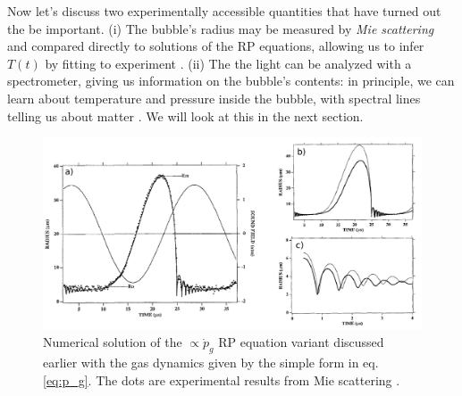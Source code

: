 \documentclass[11pt,prb,aps,nofootinbib,superscriptaddress,floatfix]{revtex4-2}
\begin{document}
Now let's discuss two experimentally accessible quantities that have turned out the be important. (i) The bubble's radius may be measured by \emph{Mie scattering} and compared directly to solutions of the RP equations, allowing us to infer $T(t)$ by fitting to experiment \cite{barber1992light,barber1997defining,brenner2002single}. (ii) The the light can be analyzed with a spectrometer, giving us information on the bubble's contents: in principle, we can learn about temperature and pressure inside the bubble, with spectral lines telling us about matter \cite{hiller1992spectrum,hilgenfeldt1999simple,flannigan2005plasma,flannigan2006measurement}. We will look at this in the next section.

\begin{figure}
\includegraphics[width=0.9\linewidth]{figs/bubble_radius_1.pdf}
    \caption{Numerical solution of the $\propto \dot{p}_g$ RP equation variant discussed earlier with the gas dynamics given by the simple form in eq. \ref{eq:p_g}. The dots are experimental results from Mie scattering \cite{barber1997defining,barber1992light}.}
\label{fig:bubble_radius_1}
\end{figure}
\end{document}
